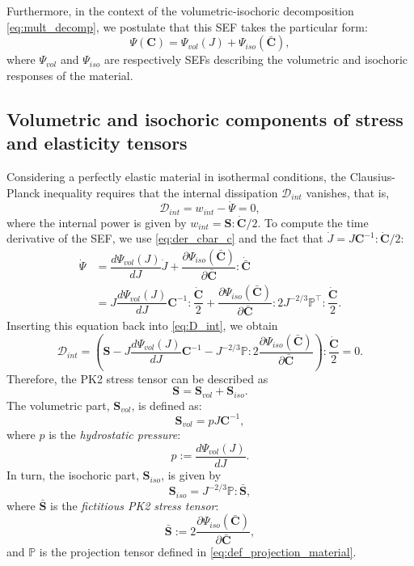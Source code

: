 \documentclass{sfuthesis}
\numberwithin{equation}{section}
\numberwithin{figure}{chapter}
\numberwithin{table}{chapter}
\theoremstyle{definition}
\def\*#1{{\mathbf{#1}}} %
\newcommand{\pder}[2]{\dfrac{\partial #1}{\partial #2}}
\newcommand{\der}[2]{\dfrac{d #1}{d #2}}
\newcommand{\T}{\top}
\renewcommand{\P}{\mathbb{P}}
\begin{document}
Furthermore, in the context of the volumetric-isochoric decomposition \eqref{eq:mult_decomp}, we postulate that this SEF takes the particular form:
\begin{equation}
    \Psi(\*C) = \Psi_{vol}(J) + \Psi_{iso}(\bar{\*C}),
\end{equation}
where $\Psi_{vol}$ and $\Psi_{iso}$ are respectively SEFs describing the volumetric and isochoric responses of the material.


\subsection*{Volumetric and isochoric components of stress and elasticity tensors}

Considering a perfectly elastic material in isothermal conditions, the Clausius-Planck inequality requires that the internal dissipation $\mathcal{D}_{int}$ vanishes, that is,
\begin{equation} \label{eq:D_int}
\mathcal{D}_{int} = w_{int} - \dot{\Psi} = 0,
\end{equation}
where the internal power is given by $w_{int} = \*S : \dot{\*C}/2$. To compute the time derivative of the SEF, we use \eqref{eq:der_cbar_c} and the fact that $\dot{J} = J \*C^{-1} : \dot{\*C}/2$:
\begin{equation} \label{eq:psi_dot}
\begin{aligned}
\dot{\Psi} &=  \der{\Psi_{vol}(J)}{J} \dot{J} + \pder{\Psi_{iso}(\bar{\*C})}{\bar{\*C}} : \dot{\bar{\*C}} \\
&= J \der{\Psi_{vol}(J)}{J} \*C^{-1} : \dfrac{\dot{\*C}}{2} + \pder{\Psi_{iso}(\bar{\*C})}{\bar{\*C}} : 2 J^{-2/3} \P^\T : \dfrac{\dot{\*C}}{2}.
\end{aligned}
\end{equation}
Inserting this equation back into \eqref{eq:D_int}, we obtain
\[
\mathcal{D}_{int} = \left( \*S - J \der{\Psi_{vol}(J)}{J} \*C^{-1} - J^{-2/3} \P : 2 \pder{\Psi_{iso}(\bar{\*C})}{\bar{\*C}} \right) : \dfrac{\dot{\*C}}{2} = 0.
\]
Therefore, the PK2 stress tensor can be described as
\begin{equation} \label{eq:def_S}
\*S = \*S_{vol} + \*S_{iso}.
\end{equation}
The volumetric part, $\*S_{vol}$, is defined as:
\begin{equation}
\*S_{vol} = p J \*C^{-1},
\end{equation}
where $p$ is the \textit{hydrostatic pressure}:
\begin{equation}
    p := \der{\Psi_{vol}(J)}{J}.
\end{equation}
In turn, the isochoric part, $\*S_{iso}$, is given by
\begin{equation} \label{eq:def_S_iso}
\*S_{iso} = J^{-2/3} \P : \bar{\*S},
\end{equation}
where $\bar{\*S}$ is the \textit{fictitious PK2 stress tensor}:
\begin{equation} \label{eq:def_S_bar}
    \bar{\*S} := 2 \pder{\Psi_{iso}(\bar{\*C})}{\bar{\*C}},
\end{equation}
and $\P$ is the projection tensor defined in \eqref{eq:def_projection_material}.
\end{document}
